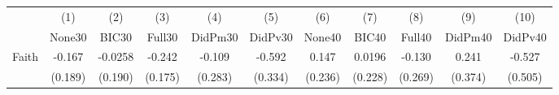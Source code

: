 {
\def\sym#1{\ifmmode^{#1}\else\(^{#1}\)\fi}
\begin{tabular}{l*{10}{c}}
\toprule
            &\multicolumn{1}{c}{(1)}&\multicolumn{1}{c}{(2)}&\multicolumn{1}{c}{(3)}&\multicolumn{1}{c}{(4)}&\multicolumn{1}{c}{(5)}&\multicolumn{1}{c}{(6)}&\multicolumn{1}{c}{(7)}&\multicolumn{1}{c}{(8)}&\multicolumn{1}{c}{(9)}&\multicolumn{1}{c}{(10)}\\
            &\multicolumn{1}{c}{None30}&\multicolumn{1}{c}{BIC30}&\multicolumn{1}{c}{Full30}&\multicolumn{1}{c}{DidPm30}&\multicolumn{1}{c}{DidPv30}&\multicolumn{1}{c}{None40}&\multicolumn{1}{c}{BIC40}&\multicolumn{1}{c}{Full40}&\multicolumn{1}{c}{DidPm40}&\multicolumn{1}{c}{DidPv40}\\
\midrule
Faith       &      -0.167         &     -0.0258         &      -0.242         &      -0.109         &      -0.592         &       0.147         &      0.0196         &      -0.130         &       0.241         &      -0.527         \\
            &     (0.189)         &     (0.190)         &     (0.175)         &     (0.283)         &     (0.334)         &     (0.236)         &     (0.228)         &     (0.269)         &     (0.374)         &     (0.505)         \\
\bottomrule
\end{tabular}
}
